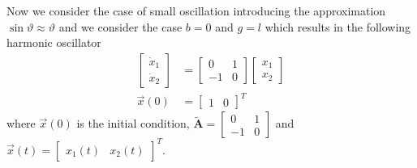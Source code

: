 \documentclass[12pt,a4paper,oneside]{book}
\begin{document}
\begin{onehalfspace}
\begin{example}
Now we consider the case of small oscillation introducing the approximation $\sin\vartheta\approx\vartheta$ and we consider the case $b=0$ and $g=l$ which results in the following harmonic oscillator
\begin{equation}
	\begin{aligned}
		\begin{bmatrix} \dot{x}_1 \\ \dot{x}_2 \end{bmatrix} &= \begin{bmatrix} 0 & 1 \\ -1 & 0 \end{bmatrix} \begin{bmatrix} {x}_1 \\ {x}_2 \end{bmatrix} \\[6pt]
		\vec{x}(0) &= \begin{bmatrix} 1 & 0 \end{bmatrix}^T
	\end{aligned}
\end{equation}
where $\vec{x}(0)$ is the initial condition, $\tilde{\mathbf{A}} = 
\begin{bmatrix} 0 & 1 \\ -1 & 0 \end{bmatrix}$ and $\vec{x}(t)= \begin{bmatrix} 
x_1(t) & x_2(t) \end{bmatrix}^T$.


\end{example}
\end{onehalfspace}
\end{document}
